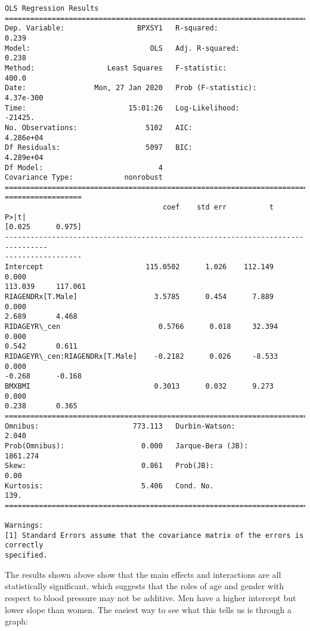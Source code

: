 \documentclass[11pt]{article}
\begin{document}
    \begin{Verbatim}[commandchars=\\\{\}]
                            OLS Regression Results
==============================================================================
Dep. Variable:                 BPXSY1   R-squared:                       0.239
Model:                            OLS   Adj. R-squared:                  0.238
Method:                 Least Squares   F-statistic:                     400.0
Date:                Mon, 27 Jan 2020   Prob (F-statistic):          4.37e-300
Time:                        15:01:26   Log-Likelihood:                -21425.
No. Observations:                5102   AIC:                         4.286e+04
Df Residuals:                    5097   BIC:                         4.289e+04
Df Model:                           4
Covariance Type:            nonrobust
================================================================================
==================
                                     coef    std err          t      P>|t|
[0.025      0.975]
--------------------------------------------------------------------------------
------------------
Intercept                        115.0502      1.026    112.149      0.000
113.039     117.061
RIAGENDRx[T.Male]                  3.5785      0.454      7.889      0.000
2.689       4.468
RIDAGEYR\_cen                       0.5766      0.018     32.394      0.000
0.542       0.611
RIDAGEYR\_cen:RIAGENDRx[T.Male]    -0.2182      0.026     -8.533      0.000
-0.268      -0.168
BMXBMI                             0.3013      0.032      9.273      0.000
0.238       0.365
==============================================================================
Omnibus:                      773.113   Durbin-Watson:                   2.040
Prob(Omnibus):                  0.000   Jarque-Bera (JB):             1861.274
Skew:                           0.861   Prob(JB):                         0.00
Kurtosis:                       5.406   Cond. No.                         139.
==============================================================================

Warnings:
[1] Standard Errors assume that the covariance matrix of the errors is correctly
specified.
\end{Verbatim}

    The results shown above show that the main effects and interactions are
all statistically significant, which suggests that the roles of age and
gender with respect to blood pressure may not be additive. Men have a
higher intercept but lower slope than women. The easiest way to see what
this tells us is through a graph:
\end{document}
